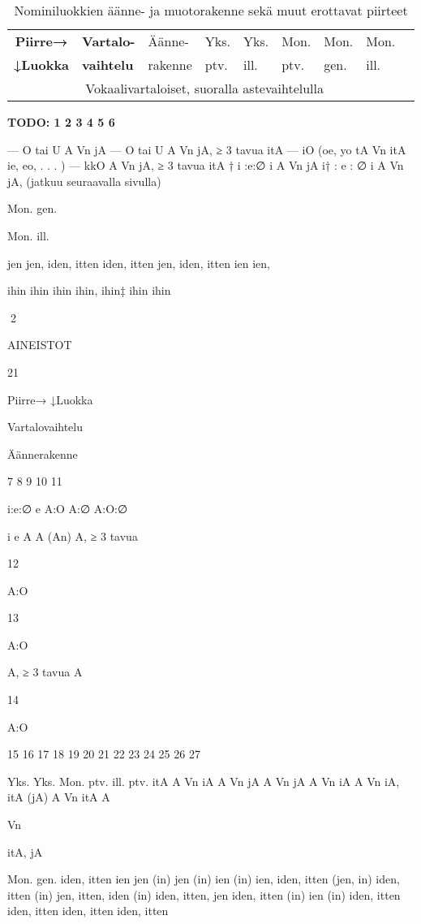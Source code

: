 \documentclass[free]{flammie}
\begin{document}
\begin{table}
        \caption{Nominiluokkien äänne- ja muotorakenne sekä
        muut erottavat piirteet}
    \begin{tabular}{|c||l|l|l|lll|l|l|}
        \hline
        \bf Piirre→ &
        \bf Vartalo- & Äänne- & Yks. & Yks. & Mon. & Mon. & Mon. \\
        \bf ↓Luokka &
        \bf vaihtelu & rakenne & ptv. & ill. & ptv.& gen. & ill. \\
        \hline
        \multicolumn{8}{|c|}{Vokaalivartaloiset, suoralla astevaihtelulla} \\
        \hline
    \end{tabular}
    \bf TODO:
1
2
3
4
5
6

—
O tai U
A
Vn
jA
—
O tai U
A
Vn
jA,
≥ 3 tavua
itA
—
iO (oe, yo tA
Vn
itA
ie, eo, . . . )
—
kkO
A
Vn
jA,
≥ 3 tavua
itA
†
i :e:∅
i
A
Vn
jA
i† : e : ∅
i
A
Vn
jA,
(jatkuu seuraavalla sivulla)

Mon.
gen.

Mon.
ill.

jen
jen,
iden, itten
iden,
itten
jen,
iden, itten
ien
ien,

ihin
ihin
ihin
ihin,
ihin‡
ihin
ihin

2

AINEISTOT

21

Piirre→
↓Luokka

Vartalovaihtelu

Äännerakenne

7
8
9
10
11

i:e:∅
e
A:O
A:∅
A:O:∅

i
e
A
A (An)
A,
≥ 3 tavua

12

A:O

13

A:O

A,
≥ 3 tavua
A

14

A:O

15
16
17
18
19
20
21
22
23
24
25
26
27

Yks. Yks. Mon.
ptv. ill.
ptv.
itA
A
Vn
iA
A
Vn
jA
A
Vn
jA
A
Vn
iA
A
Vn
iA,
itA
(jA)
A
Vn
itA
A

Vn

itA,
jA

Mon.
gen.
iden, itten
ien
jen (in)
jen (in)
ien (in)
ien, iden,
itten
(jen, in)
iden,
itten (in)
jen,
itten,
iden (in)
iden,
itten,
jen
iden,
itten (in)
ien (in)
iden,
itten
iden,
itten
iden,
itten
iden,
itten


\end{table}
\end{document}
